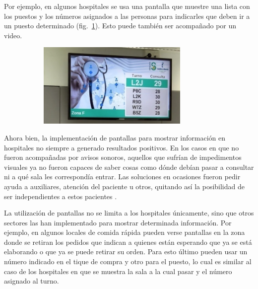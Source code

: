 \documentclass[twoside]{article}
\begin{document}
Por ejemplo, en algunos hospitales se usa una pantalla que muestre una lista con los puestos y los números asignados a las personas para indicarles que deben ir a un puesto determinado (fig.~\ref{fig:hospital}). Esto puede también ser acompañado por un video. 
\begin{figure}[H]
	\caption{Hospital con pantalla para distribuir pacientes}
    \begin{subfigure}{1.0\textwidth}
	\includegraphics[width=0.8\textwidth]{hospital.png}
    \end{subfigure}
	\label{fig:hospital}
\end{figure}
\vspace{-1.0\baselineskip}
Ahora bien, la implementación de pantallas para mostrar información en hospitales no siempre a generado resultados positivos. En los casos en que no fueron acompañadas por avisos sonoros, aquellos que sufrían de impedimentos visuales ya no fueron capaces de saber cosas como dónde debían pasar a consultar ni a qué sala les correspondía entrar. Las soluciones en ocasiones fueron pedir ayuda a auxiliares, atención del paciente u otros, quitando así la posibilidad de ser independientes a estos pacientes \parencite{pantallasChange}.

La utilización de pantallas no se limita a los hospitales únicamente, sino que otros sectores las han implementado para mostrar determinada información. Por ejemplo, en algunos locales de comida rápida pueden verse pantallas en la zona donde se retiran los pedidos que indican a quienes están esperando que ya se está elaborando o que ya se puede retirar su orden. Para esto último pueden usar un número indicado en el tique de compra y otro para el puesto, lo cual es similar al caso de los hospitales en que se muestra la sala a la cual pasar y el número asignado al turno.
\end{document}
